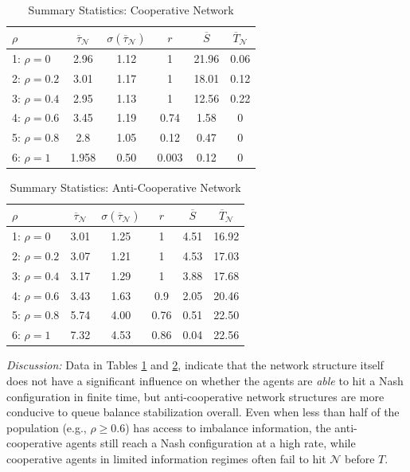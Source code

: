 \documentclass[conference]{IEEEtran}
\begin{document}
\begin{table}[t]
\centering
\caption{Summary Statistics: Cooperative Network}
\label{tab:simulation_stats_coop}
\footnotesize
\begin{tabular}{l|ccccc}
\toprule
 $\rho$ & $\overline{\tau}_{\mathcal{N}}$ & $\sigma(\overline{\tau}_{\mathcal{N}})$ & $r$ & $\overline{S}$ & $\overline{T}_{\mathcal{N}}$ \\
\midrule
1: $\rho = 0$ & 2.96 & 1.12 & 1 & 21.96 & 0.06 \\
2: $\rho = 0.2$ & 3.01 & 1.17 & 1 & 18.01 & 0.12 \\
3: $\rho = 0.4$ & 2.95 & 1.13 & 1 & 12.56 & 0.22 \\
4: $\rho = 0.6$ & 3.45 & 1.19 & 0.74 & 1.58 & 0 \\
5: $\rho = 0.8$ & 2.8 & 1.05 & 0.12 & 0.47 & 0 \\
6: $\rho = 1$ & 1.958 & 0.50 & 0.003 & 0.12 & 0  \\
\bottomrule
\end{tabular}
\end{table}

\begin{table}[t]
\centering
\caption{Summary Statistics: Anti-Cooperative Network}
\label{tab:simulation_stats_anticoop}
\footnotesize
\begin{tabular}{l|ccccc}
\toprule
 $\rho$ & $\overline{\tau}_{\mathcal{N}}$ & $\sigma(\overline{\tau}_{\mathcal{N}})$ & $r$ & $\overline{S}$ & $\overline{T}_{\mathcal{N}}$ \\
\midrule
1: $\rho = 0$ & 3.01 & 1.25 & 1 & 4.51 & 16.92 \\
2: $\rho = 0.2$ & 3.07 & 1.21 & 1 & 4.53 & 17.03 \\
3: $\rho = 0.4$ & 3.17 & 1.29 & 1 & 3.88 & 17.68 \\
4: $\rho = 0.6$ & 3.43 & 1.63 & 0.9 & 2.05 & 20.46 \\
5: $\rho = 0.8$ & 5.74 & 4.00 & 0.76 & 0.51 & 22.50 \\
6: $\rho = 1$ & 7.32 & 4.53 & 0.86 & 0.04 & 22.56  \\
\bottomrule
\end{tabular}
\end{table}

\textit{Discussion:} Data in Tables \ref{tab:simulation_stats_coop} and \ref{tab:simulation_stats_anticoop}, indicate that the network structure itself does not have a significant influence on whether the agents are \emph{able} to hit a Nash configuration in finite time, but anti-cooperative network structures are more conducive to queue balance stabilization overall. Even when less than half of the population (e.g., $\rho \ge 0.6$) has access to imbalance information, the anti-cooperative agents still reach a Nash configuration at a high rate, while cooperative agents in limited information regimes often fail to hit $\mathcal{N}$ before $T$. 
\end{document}
